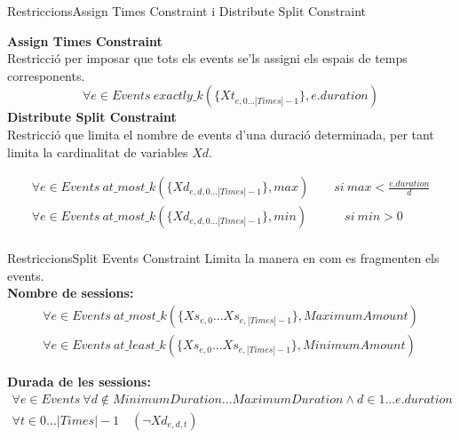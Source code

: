 \documentclass[11pt]{beamer}
\begin{document}
  
  \begin{frame}{Restriccions}{Assign Times Constraint i Distribute Split Constraint}

    \textbf{Assign Times Constraint}\\
    Restricció per imposar que tots els events se'ls assigni els espais de temps corresponents. 
    \[
      \forall e \in Events \ exactly\_k(\{Xt_{e,0 ... |Times|-1}\}, e.duration)
    \]
    \textbf{Distribute Split Constraint}\\
    Restricció que limita el nombre de events d'una duració determinada, per tant limita la cardinalitat de variables $Xd$.

      \begin{align*}
      \forall e \in Events \ at\_most\_k(\{Xd_{e,d,0 ... |Times|-1}\}, max) \quad \quad si \ max<\frac{e.duration}{d}\\
      \forall e \in Events \ at\_most\_k(\{Xd_{e,d,0 ... |Times|-1}\}, min) \quad \quad \quad si \ min>0\\
      \end{align*}

  \end{frame}

  \begin{frame}{Restriccions}{Split Events Constraint}
    Limita la manera en com es fragmenten els events.
    \\\textbf{Nombre de sessions:}
    \begin{gather*}
      \forall e \in Events \ at\_most\_k(\{Xs_{e,0} . . . Xs_{e,|Times|-1}\}, MaximumAmount)\\
      \forall e \in Events \ at\_least\_k(\{Xs_{e,0} . . . Xs_{e,|Times|-1}\}, MinimumAmount)
    \end{gather*}
  
    \textbf{Durada de les sessions:}
    \begin{gather*}
      \forall e \in Events \ \forall d \notin MinimumDuration...MaximumDuration \land d \in 1 ... e.duration  \\
      \forall t \in 0...|Times|-1 \quad (\neg Xd_{e,d,t})
    \end{gather*}  
  \end{frame}
\end{document}
